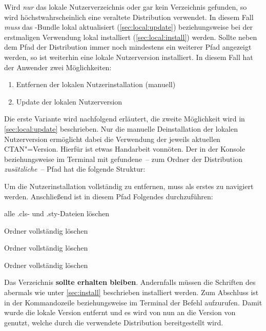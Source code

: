 Wird \emph{nur} das lokale Nutzerverzeichnis oder gar kein Verzeichnis 
gefunden, so wird höchstwahrscheinlich eine veraltete Distribution 
verwendet. In diesem Fall \emph{muss} das \TUDScript-Bundle lokal aktualisiert 
(\autoref{sec:local:update}) beziehungsweise bei der erstmaligen Verwendung 
lokal installiert (\autoref{sec:local:install}) werden. Sollte neben dem 
Pfad der Distribution immer noch mindestens ein weiterer Pfad angezeigt werden,
so ist weiterhin eine lokale Nutzerversion installiert. In diesem Fall hat der 
Anwender zwei Möglichkeiten:
%
\begin{enumerate}
\item Entfernen der lokalen Nutzerinstallation (manuell)
\item Update der lokalen Nutzerversion
\end{enumerate}
%
Die erste Variante wird nachfolgend erläutert, die zweite Möglichkeit wird in 
\autoref{sec:local:update} beschrieben. Nur die manuelle Deinstallation der 
lokalen Nutzerversion \TUDScript ermöglicht dabei die Verwendung der jeweils 
aktuellen CTAN"=Version. Hierfür ist etwas Handarbeit vonnöten. Der in der 
Konsole beziehungsweise im Terminal mit  
gefundene~-- zum Ordner der Distribution \emph{zusätzliche}~-- Pfad hat die 
folgende Struktur:
%
\begin{quoting}
\end{quoting}
%
Um die Nutzerinstallation vollständig zu entfernen, muss als erstes zu 
 navigiert werden. Anschließend ist in diesem 
Pfad Folgendes durchzuführen:
%
%
\begin{description}[labelwidth=\tempdim,labelsep=1em]
\item[\Path{tex/latex/tudscr/}]alle .cls- und .sty-Dateien löschen
\item[\Path{tex/latex/tudscr/}]Ordner  vollständig löschen
\item[\Path{doc/latex/}] Ordner  vollständig löschen
\item[\Path{source/latex/}] Ordner  vollständig löschen
\end{description}
%
Das Verzeichnis  
\textbf{sollte erhalten bleiben}. Andernfalls müssen die Schriften des \CDs 
abermals wie unter \autoref{sec:install} beschrieben installiert werden.
Zum Abschluss ist in der Kommandozeile beziehungsweise im Terminal der Befehl 
 aufzurufen. Damit wurde die lokale Version entfernt und es wird 
von nun an die Version von \TUDScript genutzt, welche durch die verwendete 
Distribution bereitgestellt wird.

